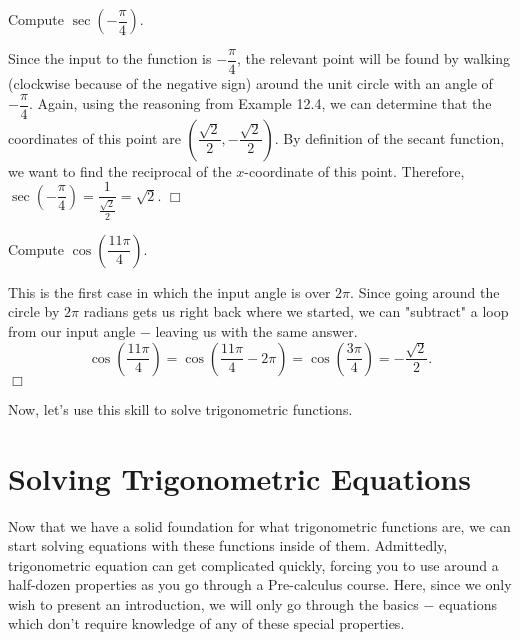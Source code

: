 \documentclass[../book.tex]{subfiles}
\begin{document}
\begin{example}
Compute $\sec\left(-\dfrac{\pi}{4}\right)$.
\end{example}
\begin{solution}
Since the input to the function is $-\dfrac{\pi}{4}$, the relevant point will be found by walking (clockwise because of the negative sign) around the unit circle with an angle of $-\dfrac{\pi}{4}$. Again, using the reasoning from Example 12.4, we can determine that the coordinates of this point are $\left(\dfrac{\sqrt{2}}{2},-\dfrac{\sqrt{2}}{2}\right)$. By definition of the secant function, we want to find the reciprocal of the $x$-coordinate of this point. Therefore, $\sec\left(-\dfrac{\pi}{4}\right)=\dfrac{1}{\frac{\sqrt{2}}{2}}=\sqrt{2}.$ $\Box$
\end{solution}
\begin{example}
Compute $\cos\left(\dfrac{11\pi}{4}\right)$.
\end{example}
\begin{solution}
This is the first case in which the input angle is over $2\pi$. Since going around the circle by $2\pi$ radians gets us right back where we started, we can "subtract" a loop from our input angle $-$ leaving us with the same answer. $$\cos\left(\dfrac{11\pi}{4}\right)=\cos\left(\dfrac{11\pi}{4}-2\pi\right)=\cos\left(\dfrac{3\pi}{4}\right)=-\dfrac{\sqrt{2}}{2}.$$ $\Box$
\end{solution}
\noindent Now, let's use this skill to solve trigonometric functions.
\section{Solving Trigonometric Equations}
\noindent Now that we have a solid foundation for what trigonometric functions are, we can start solving equations with these functions inside of them. Admittedly, trigonometric equation can get complicated quickly, forcing you to use around a half-dozen properties as you go through a Pre-calculus course. Here, since we only wish to present an introduction, we will only go through the basics $-$ equations which don't require knowledge of any of these special properties. 
\end{document}
